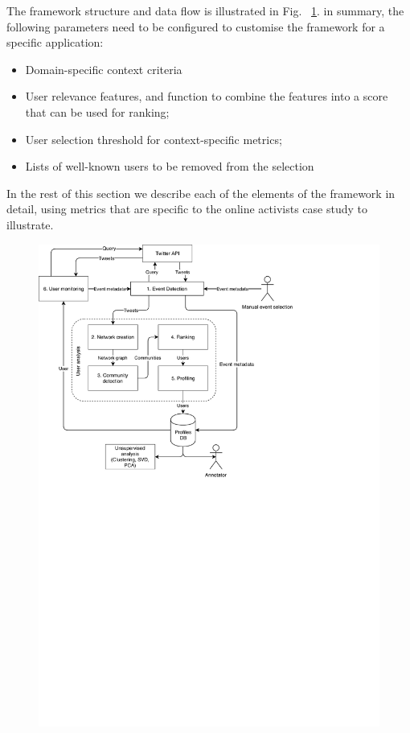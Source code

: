 \documentclass[runningheads]{llncs}
\begin{document}
The framework structure and data flow is illustrated in Fig. ~\ref{fig:twitterframework}.
in summary, the following parameters need to be configured to customise the framework for a specific application:

	\begin{itemize}
		\item Domain-specific context criteria
		\item User relevance features, and function to combine the features into a score that can be used for ranking;
		\item User selection threshold for context-specific metrics;
		\item Lists of well-known users to be removed from the selection
	\end{itemize}

In the rest of this section we describe each of the elements of the framework in detail, using metrics that are specific to the online activists case study to illustrate.

\begin{figure}
	\centering
	\includegraphics[width=0.7\linewidth]{figures/TwitterFramework}
	\caption{}
	\label{fig:twitterframework}
\end{figure}
\end{document}
